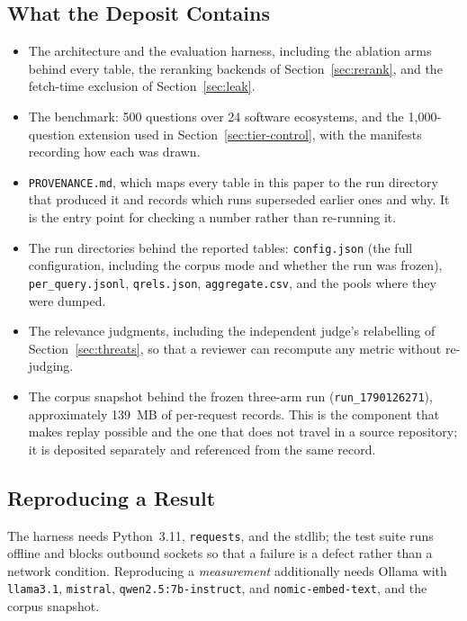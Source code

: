 \documentclass[acmsmall,review,anonymous,screen]{acmart}
\begin{document}
\subsection{What the Deposit Contains}

\begin{itemize}
  \item The architecture and the evaluation harness, including the ablation arms
  behind every table, the reranking backends of Section~\ref{sec:rerank}, and
  the fetch-time exclusion of Section~\ref{sec:leak}.
  \item The benchmark: 500 questions over 24 software ecosystems, and the
  1{,}000-question extension used in Section~\ref{sec:tier-control}, with the
  manifests recording how each was drawn.
  \item \texttt{PROVENANCE.md}, which maps every table in this paper to the run
  directory that produced it and records which runs superseded earlier ones and
  why. It is the entry point for checking a number rather than re-running it.
  \item The run directories behind the reported tables:
  \texttt{config.json} (the full configuration, including the corpus mode and
  whether the run was frozen), \texttt{per\_query.jsonl}, \texttt{qrels.json},
  \texttt{aggregate.csv}, and the pools where they were dumped.
  \item The relevance judgments, including the independent judge's relabelling
  of Section~\ref{sec:threats}, so that a reviewer can recompute any metric
  without re-judging.
  \item The corpus snapshot behind the frozen three-arm run
  (\texttt{run\_1790126271}), approximately 139~MB of per-request records. This
  is the component that makes replay possible and the one that does not travel
  in a source repository; it is deposited separately and referenced from the
  same record.
\end{itemize}

\subsection{Reproducing a Result}

The harness needs Python~3.11, \texttt{requests}, and the stdlib; the test suite
runs offline and blocks outbound sockets so that a failure is a defect rather
than a network condition. Reproducing a \emph{measurement} additionally needs
Ollama with \texttt{llama3.1}, \texttt{mistral}, \texttt{qwen2.5:7b-instruct},
and \texttt{nomic-embed-text}, and the corpus snapshot.
\end{document}
